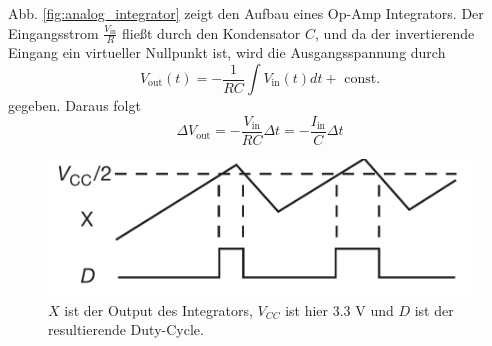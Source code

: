 \documentclass[12pt,a4paper,bibliography=totocnumbered,listof=totocnumbered]{article}
\begin{document}
Abb. \ref{fig:analog_integrator} zeigt den Aufbau eines Op-Amp Integrators. Der Eingangsstrom $\frac{V_{\text{in}}}{R}$ fließt durch den Kondensator $C$, und da der invertierende Eingang ein virtueller Nullpunkt ist, wird die Ausgangsspannung durch
$$V_{\text{out}}(t) = - \frac{1}{RC} \int V_{\text{in}}(t) dt + \text{ const.}$$
gegeben. Daraus folgt
$$\Delta V_{\text{out}} = - \frac{V_{\text{in}}}{RC} \Delta t = - \frac{I_{\text{in}}}{C} \Delta t$$ \cite{aoe}

\begin{figure}[htpb]
    \centering
    \includegraphics[width=0.5\linewidth,keepaspectratio=true]{pics/coulomb_counter_output.png}
    \caption{$X$ ist der Output des Integrators, $V_{CC}$ ist hier 3.3 V und $D$ ist der resultierende Duty-Cycle. \cite{aoe}}
    \label{fig:coulomb_counter_output}    
\end{figure}
\end{document}
